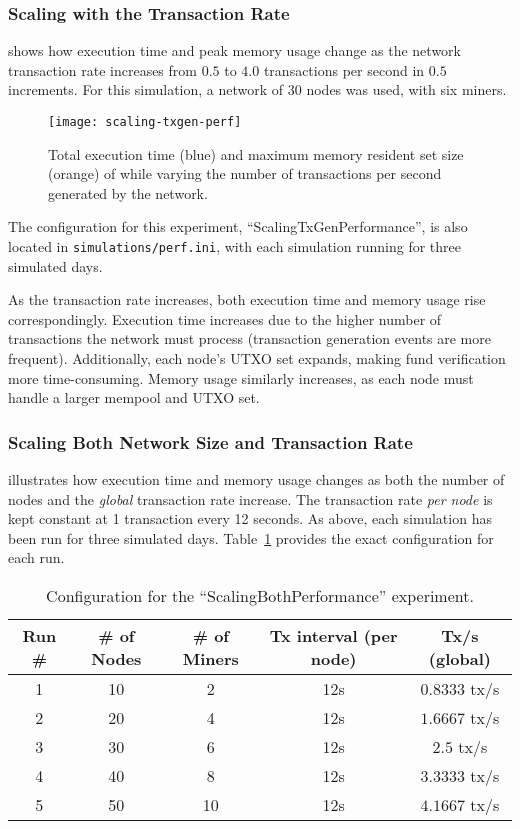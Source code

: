 \subsubsection{Scaling with the Transaction Rate}\label{subsubsec:scaling-tx}

 shows how execution time and peak memory usage change
as the network transaction rate increases from \(0.5\) to \(4.0\) transactions
per second in \(0.5\) increments. For this simulation, a network of 30 nodes
was used, with six miners.

\begin{figure}[tbhp]
	\centering
	\texttt{[image: scaling-txgen-perf]}
	\caption{Total execution time (blue) and maximum memory resident set
	size (orange) of \iblock{} while varying the number of transactions per
	second generated by the network.}\label{fig:scaling-tx}
\end{figure}

The configuration for this experiment, ``ScalingTxGenPerformance'', is also
located in \texttt{simulations/perf.ini}, with each simulation running for
three simulated days.

As the transaction rate increases, both execution time and memory usage rise
correspondingly. Execution time increases due to the higher number of
transactions the network must process (transaction generation events are more
frequent). Additionally, each node's UTXO set expands, making fund
verification more time-consuming. Memory usage similarly increases, as each
node must handle a larger mempool and UTXO set.

\subsubsection{Scaling Both Network Size and Transaction
Rate}\label{subsubsec:scaling-both}

 illustrates how execution time and memory usage
changes as both the number of nodes and the \emph{global} transaction rate
increase. The transaction rate \emph{per node} is kept constant at 1
transaction every 12 seconds. As above, each simulation has been run for three
simulated days. Table~\ref{tab:scaling-both} provides the exact configuration
for each run.

\begin{table}[tbhp]
	\centering
	\begin{tabular}{|c|c|c|c|c|}
		\toprule
		Run \# & \# of Nodes & \# of Miners & Tx interval (per node) & Tx/s (global) \\
		\midrule
		1 & 10 & 2 & 12s & \(0.8333\) tx/s \\\midrule
		2 & 20 & 4 & 12s & \(1.6667\) tx/s \\\midrule
		3 & 30 & 6 & 12s & \(2.5\) tx/s \\\midrule
		4 & 40 & 8 & 12s & \(3.3333\) tx/s \\\midrule
		5 & 50 & 10 & 12s & \(4.1667\) tx/s \\
		\bottomrule
	\end{tabular}
	\caption{Configuration for the ``ScalingBothPerformance''
	experiment.}\label{tab:scaling-both}
\end{table}

